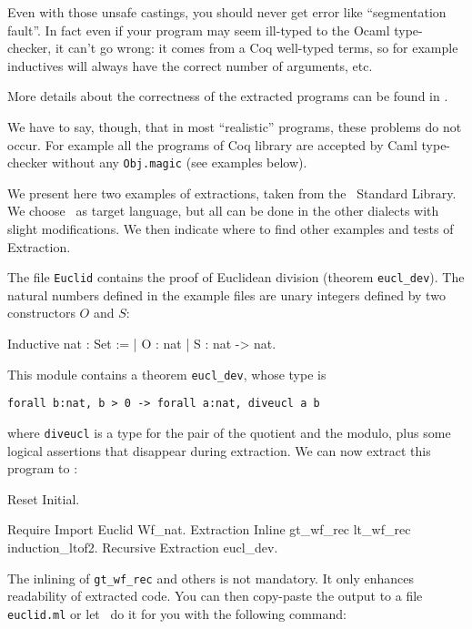 \noindent Even with those unsafe castings, you should never get error like
``segmentation fault''. In fact even if your program may seem
ill-typed to the Ocaml type-checker, it can't go wrong: it comes 
from a Coq well-typed terms, so for example inductives will always 
have the correct number of arguments, etc. 

More details about the correctness of the extracted programs can be 
found in \cite{Let02}.

We have to say, though, that in most ``realistic'' programs, these
problems do not occur. For example all the programs of Coq library are
accepted by Caml type-checker without any {\tt Obj.magic} (see examples below).




We present here two examples of extractions, taken from the 
\Coq\ Standard Library. We choose \ocaml\ as target language, 
but all can be done in the other dialects with slight modifications.
We then indicate where to find other examples and tests of Extraction.


The file {\tt Euclid} contains the proof of Euclidean division
(theorem {\tt eucl\_dev}). The natural numbers defined in the example
files are unary integers defined by two constructors $O$ and $S$:
\begin{coq_example*}
Inductive nat : Set :=
  | O : nat
  | S : nat -> nat.
\end{coq_example*}

\noindent This module contains a theorem {\tt eucl\_dev}, whose type is
\begin{verbatim}
forall b:nat, b > 0 -> forall a:nat, diveucl a b
\end{verbatim}
where {\tt diveucl} is a type for the pair of the quotient and the
modulo, plus some logical assertions that disappear during extraction.
We can now extract this program to \ocaml:

\begin{coq_eval}
Reset Initial.
\end{coq_eval}
\begin{coq_example}
Require Import Euclid Wf_nat.
Extraction Inline gt_wf_rec lt_wf_rec induction_ltof2.
Recursive Extraction eucl_dev.
\end{coq_example}

\noindent The inlining of {\tt gt\_wf\_rec} and others is not
mandatory. It only enhances readability of extracted code.
You can then copy-paste the output to a file {\tt euclid.ml} or let 
\Coq\ do it for you with the following command: 

